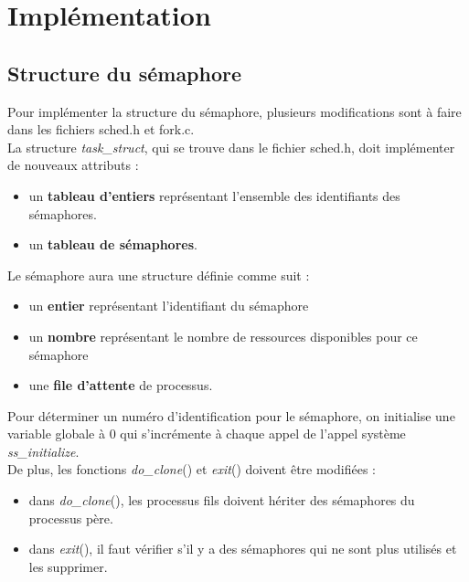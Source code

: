 \documentclass[12pt]{article}
\begin{document}
\newpage
\section{Implémentation}
    \subsection{Structure du sémaphore}
      Pour implémenter la structure du sémaphore, plusieurs modifications sont à faire dans les fichiers sched.h et fork.c.\\

      La structure \textit{task\_struct}, qui se trouve dans le fichier sched.h, doit implémenter de nouveaux attributs :
      \begin{itemize}
        \item un \textbf{tableau d'entiers} représentant l'ensemble des identifiants des sémaphores.
        \item un \textbf{tableau de sémaphores}.\\
      \end{itemize}

      Le sémaphore aura une structure définie comme suit :
      \begin{itemize}
        \item un \textbf{entier} représentant l'identifiant du sémaphore
        \item un \textbf{nombre} représentant le nombre de ressources disponibles pour ce sémaphore
        \item une \textbf{file d'attente} de processus.\\
      \end{itemize}
      Pour déterminer un numéro d'identification pour le sémaphore, on initialise une variable globale à 0 qui s'incrémente à chaque appel de l'appel système \textit{ss\_initialize}.\\

      De plus, les fonctions \textit{do\_clone}() et \textit{exit}() doivent être modifiées :
      \begin{itemize}
        \item dans \textit{do\_clone}(), les processus fils doivent hériter des sémaphores du processus père.
        \item dans \textit{exit}(), il faut vérifier s'il y a des sémaphores qui ne sont plus utilisés et les supprimer.\\
      \end{itemize}
\end{document}
